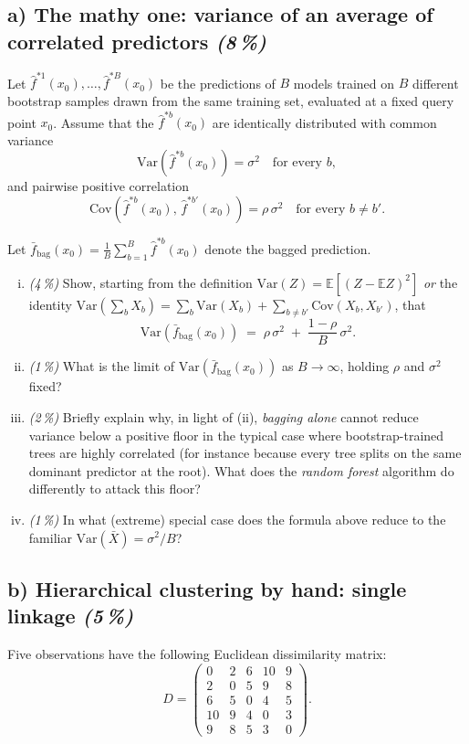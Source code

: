 \documentclass[11pt,a4paper]{article}
\newcommand{\subpoints}[1]{\textit{(#1\,\%)}}
\begin{document}
\subsection*{a) The mathy one: variance of an average of correlated predictors \subpoints{8}}

Let $\hat f^{*1}(x_0), \dots, \hat f^{*B}(x_0)$ be the predictions of $B$ models trained on $B$ different bootstrap samples drawn from the same training set, evaluated at a fixed query point $x_0$. Assume that the $\hat f^{*b}(x_0)$ are identically distributed with common variance
$$\mathrm{Var}\!\left(\hat f^{*b}(x_0)\right) = \sigma^2 \quad \text{for every } b,$$
and pairwise positive correlation
$$\mathrm{Cov}\!\left(\hat f^{*b}(x_0),\, \hat f^{*b'}(x_0)\right) = \rho\,\sigma^2 \quad \text{for every } b \neq b'.$$

Let $\bar f_{\text{bag}}(x_0) = \frac{1}{B}\sum_{b=1}^B \hat f^{*b}(x_0)$ denote the bagged prediction.

\begin{enumerate}[(i)]
  \item \subpoints{4} Show, starting from the definition $\mathrm{Var}(Z) = \mathbb{E}\!\left[(Z - \mathbb{E} Z)^2\right]$ \emph{or} the identity $\mathrm{Var}(\sum_b X_b) = \sum_b \mathrm{Var}(X_b) + \sum_{b\neq b'} \mathrm{Cov}(X_b, X_{b'})$, that
  $$\boxed{\;\mathrm{Var}\!\left(\bar f_{\text{bag}}(x_0)\right) \;=\; \rho\,\sigma^2 \;+\; \frac{1 - \rho}{B}\,\sigma^2.\;}$$
  \item \subpoints{1} What is the limit of $\mathrm{Var}\!\left(\bar f_{\text{bag}}(x_0)\right)$ as $B \to \infty$, holding $\rho$ and $\sigma^2$ fixed?
  \item \subpoints{2} Briefly explain why, in light of (ii), \emph{bagging alone} cannot reduce variance below a positive floor in the typical case where bootstrap-trained trees are highly correlated (for instance because every tree splits on the same dominant predictor at the root). What does the \emph{random forest} algorithm do differently to attack this floor?
  \item \subpoints{1} In what (extreme) special case does the formula above reduce to the familiar $\mathrm{Var}(\bar X) = \sigma^2 / B$?
\end{enumerate}

\subsection*{b) Hierarchical clustering by hand: single linkage \subpoints{5}}
Five observations have the following Euclidean dissimilarity matrix:
$$D = \begin{pmatrix}
0 & 2 & 6 & 10 & 9 \\
2 & 0 & 5 & 9 & 8 \\
6 & 5 & 0 & 4 & 5 \\
10 & 9 & 4 & 0 & 3 \\
9 & 8 & 5 & 3 & 0
\end{pmatrix}.$$
\end{document}
